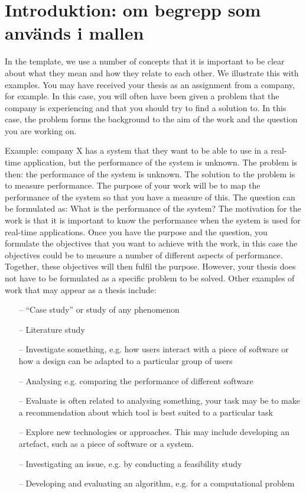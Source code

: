 \section*{Introduktion: om begrepp som används i mallen}

In the template, we use a number of concepts that it is important to be clear about what they mean and how they relate to each other.
We illustrate this with examples.
You may have received your thesis as an assignment from a company, for example.
In this case, you will often have been given a problem that the company is experiencing and that you should try to find a solution to. 
In this case, the problem forms the background to the aim of the work and the question you are working on.

Example: company X has a system that they want to be able to use in a real-time application, but the performance of the system is unknown. 
The problem is then: the performance of the system is unknown.
The solution to the problem is to measure performance.
The purpose of your work will be to map the performance of the system so that you have a measure of this. 
The question can be formulated as: What is the performance of the system? The motivation for the work is that it is important to know the performance when the system is used for real-time applications.
Once you have the purpose and the question, you formulate the objectives that you want to achieve with the work, in this case the objectives could be to measure a number of different aspects of performance. 
Together, these objectives will then fulfil the purpose. 
However, your thesis does not have to be formulated as a specific problem to be solved.
Other examples of work that may appear as a thesis include:

\begin{itemize}
    \item[--] ``Case study'' or study of any phenomenon
    \item[--] Literature study
    \item[--] Investigate something, e.g. how users interact with a piece of software or how a design can be adapted to a particular group of users
    \item[--] Analysing e.g. comparing the performance of different software
    \item[--] Evaluate is often related to analysing something, your task may be to make a recommendation about which tool is best suited to a particular task
    \item[--] Explore new technologies or approaches. This may include developing an artefact, such as a piece of software or a system. 
    \item[--] Investigating an issue, e.g. by conducting a feasibility study
    \item[--] Developing and evaluating an algorithm, e.g. for a computational problem
    \end{itemize}
    
